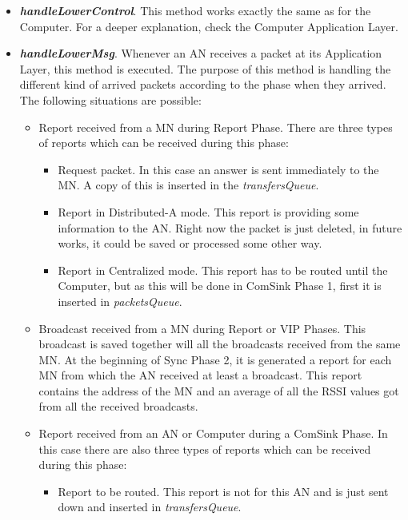 \begin{itemize}
  \item \textbf{\textit{handleLowerControl}}. This method works exactly the same as for the Computer. For a deeper explanation, check the Computer 
  Application Layer.

  \item \textbf{\textit{handleLowerMsg}}. Whenever an \ac{AN} receives a packet at its Application Layer, this method is executed. The purpose
  of this method is handling the different kind of arrived packets according to the phase when they arrived. The following situations are possible:
  \begin{itemize}
    \item Report received from a \ac{MN} during Report Phase. There are three types of reports which can be received during this phase:
    \begin{itemize}
      \item Request packet. In this case an answer is sent immediately to the \ac{MN}. A copy of this is inserted in the \textit{transfersQueue}.

      \item Report in Distributed-A mode. This report is providing some information to the \ac{AN}. Right now the packet is just deleted, in future
      works, it could be saved or processed some other way.

      \item Report in Centralized mode. This report has to be routed until the Computer, but as this will be done in ComSink Phase 1, first it is
      inserted in \textit{packetsQueue}.
    \end{itemize}

    \item Broadcast received from a \ac{MN} during Report or \ac{VIP} Phases. This broadcast is saved together will all the broadcasts received
    from the same \ac{MN}. At the beginning of Sync Phase 2, it is generated a report for each \ac{MN} from which the \ac{AN} received at least a 
    broadcast. This report contains the address of the \ac{MN} and an average of all the \ac{RSSI} values got from all the received broadcasts.

    \item Report received from an \ac{AN} or Computer during a ComSink Phase. In this case there are also three types of reports which can be 
    received during this phase:
    \begin{itemize}
      \item Report to be routed. This report is not for this \ac{AN} and is just sent down and inserted in \textit{transfersQueue}.
      

\end{itemize}
\end{itemize}
\end{itemize}

